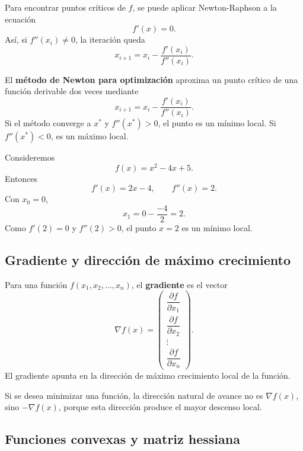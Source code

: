 \documentclass[a4,11pt]{aleph-notas}
\begin{document}
Para encontrar puntos críticos de $f$, se puede aplicar Newton-Raphson a la ecuación
\[
    f'(x)=0.
\]
Así, si $f''(x_i)\neq 0$, la iteración queda
\[
    x_{i+1}=x_i-\frac{f'(x_i)}{f''(x_i)}.
\]

\begin{defi}
    El \textbf{método de Newton para optimización} aproxima un punto crítico de una función derivable dos veces mediante
    \[
        x_{i+1}=x_i-\frac{f'(x_i)}{f''(x_i)}.
    \]
    Si el método converge a $x^\ast$ y $f''(x^\ast)>0$, el punto es un mínimo local. Si $f''(x^\ast)<0$, es un máximo local.
\end{defi}

\begin{ejem}
    Consideremos
    \[
        f(x)=x^2-4x+5.
    \]
    Entonces
    \[
        f'(x)=2x-4,\qquad f''(x)=2.
    \]
    Con $x_0=0$,
    \[
        x_1=0-\frac{-4}{2}=2.
    \]
    Como $f'(2)=0$ y $f''(2)>0$, el punto $x=2$ es un mínimo local.
\end{ejem}


\subsection{Gradiente y dirección de máximo crecimiento}

\begin{defi}[Gradiente]
    Para una función $f(x_1,x_2,\ldots,x_n)$, el \textbf{gradiente} es el vector
    \[
        \nabla f({x})
        =
        \begin{pmatrix}
            \dfrac{\partial f}{\partial x_1}\\[2mm]
            \dfrac{\partial f}{\partial x_2}\\
            \vdots\\
            \dfrac{\partial f}{\partial x_n}
        \end{pmatrix}.
    \]
    El gradiente apunta en la dirección de máximo crecimiento local de la función.
\end{defi}

\begin{advertencia}
    Si se desea minimizar una función, la dirección natural de avance no es $\nabla f({x})$, sino $-\nabla f({x})$, porque esta dirección produce el mayor descenso local.
\end{advertencia}

\subsection{Funciones convexas y matriz hessiana}
\end{document}

